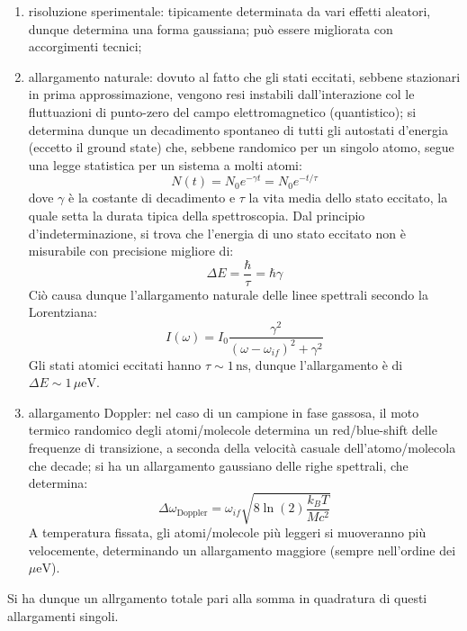 \begin{enumerate}
	\item risoluzione sperimentale: tipicamente determinata da vari effetti aleatori, dunque determina una forma gaussiana; può essere migliorata con accorgimenti tecnici;
	\item allargamento naturale: dovuto al fatto che gli stati eccitati, sebbene stazionari in prima approssimazione, vengono resi instabili dall'interazione col le fluttuazioni di punto-zero del campo elettromagnetico (quantistico); si determina dunque un decadimento spontaneo di tutti gli autostati d'energia (eccetto il ground state) che, sebbene randomico per un singolo atomo, segue una legge statistica per un sistema a molti atomi:
	\begin{equation*}
		N(t) = N_0 e^{- \gamma t} = N_0 e^{- t / \tau}
	\end{equation*}
	dove $ \gamma $ è la costante di decadimento e $ \tau $ la vita media dello stato eccitato, la quale setta la durata tipica della spettroscopia. Dal principio d'indeterminazione, si trova che l'energia di uno stato eccitato non è misurabile con precisione migliore di:
	\begin{equation*}
		\Delta E = \frac{\hbar}{\tau} = \hbar \gamma
	\end{equation*}
	Ciò causa dunque l'allargamento naturale delle linee spettrali secondo la Lorentziana:
	\begin{equation*}
		I(\omega) = I_0 \frac{\gamma^2}{(\omega - \omega_{if})^2 + \gamma^2}
	\end{equation*}
	Gli stati atomici eccitati hanno $ \tau \sim 1\,\text{ns} $, dunque l'allargamento è di $ \Delta E \sim 1\,\mu\text{eV} $.
	\item allargamento Doppler: nel caso di un campione in fase gassosa, il moto termico randomico degli atomi/molecole determina un red/blue-shift delle frequenze di transizione, a seconda della velocità casuale dell'atomo/molecola che decade; si ha un allargamento gaussiano delle righe spettrali, che determina:
	\begin{equation*}
		\Delta \omega_\text{Doppler} = \omega_{if} \sqrt{8 \ln(2) \frac{k_B T}{M c^2}}
	\end{equation*}
	A temperatura fissata, gli atomi/molecole più leggeri si muoveranno più velocemente, determinando un allargamento maggiore (sempre nell'ordine dei $ \mu\text{eV} $).
\end{enumerate}
Si ha dunque un allrgamento totale pari alla somma in quadratura di questi allargamenti singoli.










